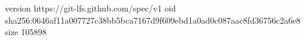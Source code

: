 version https://git-lfs.github.com/spec/v1
oid sha256:0646af11a007727c38bb5bca7167d9f609ebd1a0ad0c087aac8fd36756c2a6e8
size 105898
